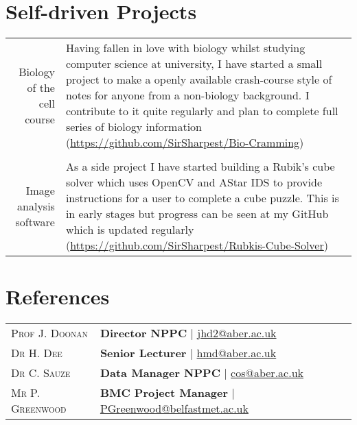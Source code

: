 \documentclass[a4paper,10pt]{article}
\begin{document}
\section{Self-driven Projects}

\begin{tabular}{r|p{10cm}}
  Biology of the cell course & Having fallen in love with biology whilst studying computer science at university, I have started a small project to make a openly available crash-course style of notes for anyone from a non-biology background. I contribute to it quite regularly and plan to complete full series of biology information (\href{https://github.com/SirSharpest/Bio-Cramming}{https://github.com/SirSharpest/Bio-Cramming})\\
  \\
  Image analysis software& As a side project I have started building a Rubik's cube solver which uses OpenCV and AStar IDS to provide instructions for a user to complete a cube puzzle. This is in early stages but progress can be seen at my GitHub which is updated regularly (\href{https://github.com/SirSharpest/Rubkis-Cube-Solver}{https://github.com/SirSharpest/Rubkis-Cube-Solver})
\end{tabular}

\section{References}
\begin{tabular}{ll}
  \textsc{Prof J. Doonan} & \textbf{Director NPPC} | \href{jhd2@aber.ac.uk}{jhd2@aber.ac.uk}
  \\
  \textsc{Dr H. Dee} & \textbf{Senior Lecturer} | \href{hmd@aber.ac.uk}{hmd@aber.ac.uk}
  \\
  \textsc{Dr C. Sauze} & \textbf{Data Manager NPPC} | \href{cos@aber.ac.uk}{cos@aber.ac.uk}
\\
  \textsc{Mr P. Greenwood} & \textbf{BMC Project Manager} | \href{PGreenwood@belfastmet.ac.uk}{PGreenwood@belfastmet.ac.uk}
  \\
\end{tabular}
\end{document}
